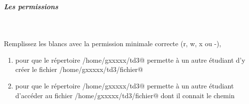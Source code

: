 \documentclass[11pt,a4paper]{article}
\begin{document}
			
		\subparagraph{Les permissions} 
		
                \textcolor{white}{.} \par
            Remplissez les blancs avec la permission minimale correcte (r, w, x ou -),
					\begin{enumerate}
				
			\item 
									pour que le r\'epertoire \verb@/home/gxxxxx/td3@ 
									permette \`a un autre \'etudiant d'y cr\'eer le fichier  
									\verb@/home/gxxxxx/td3/fichier@\par
				 \textcolor{gray}{\underline{\hspace*{1em}}}  \textcolor{gray}{\underline{\hspace*{1em}}}  \textcolor{gray}{\underline{\hspace*{1em}}}  \textcolor{gray}{\underline{\hspace*{1em}}}  \textcolor{gray}{\underline{\hspace*{1em}}}  \textcolor{gray}{\underline{\hspace*{1em}}}  \textcolor{gray}{\underline{\hspace*{1em}}}  \textcolor{gray}{\underline{\hspace*{1em}}}  \textcolor{gray}{\underline{\hspace*{1em}}} 
			\item 
									pour que le r\'epertoire \verb@/home/gxxxxx/td3@ 
									permette \`a un autre \'etudiant d'acc\'eder au fichier  
									\verb@/home/gxxxxx/td3/fichier@
									dont il connait le chemin
									\par
				 \textcolor{gray}{\underline{\hspace*{1em}}}  \textcolor{gray}{\underline{\hspace*{1em}}}  \textcolor{gray}{\underline{\hspace*{1em}}}  \textcolor{gray}{\underline{\hspace*{1em}}}  \textcolor{gray}{\underline{\hspace*{1em}}}  \textcolor{gray}{\underline{\hspace*{1em}}}  \textcolor{gray}{\underline{\hspace*{1em}}}  \textcolor{gray}{\underline{\hspace*{1em}}}  \textcolor{gray}{\underline{\hspace*{1em}}} 
					\end{enumerate}
				
			
		\subparagraph{} 
		
\end{document}
